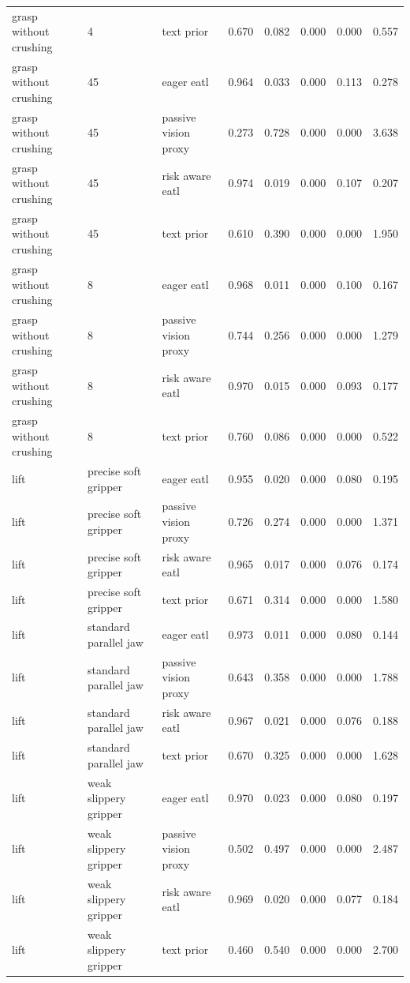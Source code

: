 \begin{longtable}{lllrrrrr}
grasp without crushing & 4 & text prior & 0.670 & 0.082 & 0.000 & 0.000 & 0.557 \\
grasp without crushing & 45 & eager eatl & 0.964 & 0.033 & 0.000 & 0.113 & 0.278 \\
grasp without crushing & 45 & passive vision proxy & 0.273 & 0.728 & 0.000 & 0.000 & 3.638 \\
grasp without crushing & 45 & risk aware eatl & 0.974 & 0.019 & 0.000 & 0.107 & 0.207 \\
grasp without crushing & 45 & text prior & 0.610 & 0.390 & 0.000 & 0.000 & 1.950 \\
grasp without crushing & 8 & eager eatl & 0.968 & 0.011 & 0.000 & 0.100 & 0.167 \\
grasp without crushing & 8 & passive vision proxy & 0.744 & 0.256 & 0.000 & 0.000 & 1.279 \\
grasp without crushing & 8 & risk aware eatl & 0.970 & 0.015 & 0.000 & 0.093 & 0.177 \\
grasp without crushing & 8 & text prior & 0.760 & 0.086 & 0.000 & 0.000 & 0.522 \\
lift & precise soft gripper & eager eatl & 0.955 & 0.020 & 0.000 & 0.080 & 0.195 \\
lift & precise soft gripper & passive vision proxy & 0.726 & 0.274 & 0.000 & 0.000 & 1.371 \\
lift & precise soft gripper & risk aware eatl & 0.965 & 0.017 & 0.000 & 0.076 & 0.174 \\
lift & precise soft gripper & text prior & 0.671 & 0.314 & 0.000 & 0.000 & 1.580 \\
lift & standard parallel jaw & eager eatl & 0.973 & 0.011 & 0.000 & 0.080 & 0.144 \\
lift & standard parallel jaw & passive vision proxy & 0.643 & 0.358 & 0.000 & 0.000 & 1.788 \\
lift & standard parallel jaw & risk aware eatl & 0.967 & 0.021 & 0.000 & 0.076 & 0.188 \\
lift & standard parallel jaw & text prior & 0.670 & 0.325 & 0.000 & 0.000 & 1.628 \\
lift & weak slippery gripper & eager eatl & 0.970 & 0.023 & 0.000 & 0.080 & 0.197 \\
lift & weak slippery gripper & passive vision proxy & 0.502 & 0.497 & 0.000 & 0.000 & 2.487 \\
lift & weak slippery gripper & risk aware eatl & 0.969 & 0.020 & 0.000 & 0.077 & 0.184 \\
lift & weak slippery gripper & text prior & 0.460 & 0.540 & 0.000 & 0.000 & 2.700 \\

\end{longtable}
